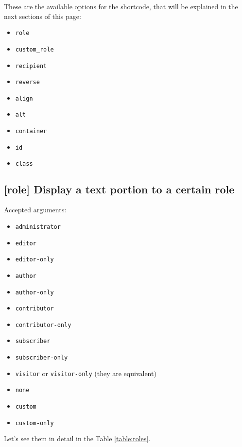 \documentclass[a4paper,11pt]{article}
\begin{document}
These are the available options for the shortcode, that will be explained in the next sections of this page:

\begin{itemize}
 \item \verb+role+
 \item \verb+custom_role+
 \item \verb+recipient+
 \item \verb+reverse+
 \item \verb+align+
 \item \verb+alt+
 \item \verb+container+
 \item \verb+id+
 \item \verb+class+
\end{itemize}

\subsection{[role] Display a text portion to a certain role}

Accepted arguments:

\begin{itemize}
 \item \verb+administrator+
 \item \verb+editor+
 \item \verb+editor-only+
 \item \verb+author+
 \item \verb+author-only+
 \item \verb+contributor+
 \item \verb+contributor-only+
 \item \verb+subscriber+
 \item \verb+subscriber-only+
 \item \verb+visitor+ or \verb+visitor-only+ (they are equivalent)
 \item \verb+none+
 \item \verb+custom+
 \item \verb+custom-only+
\end{itemize}

Let's see them in detail in the Table \ref{table:roles}.
\end{document}
